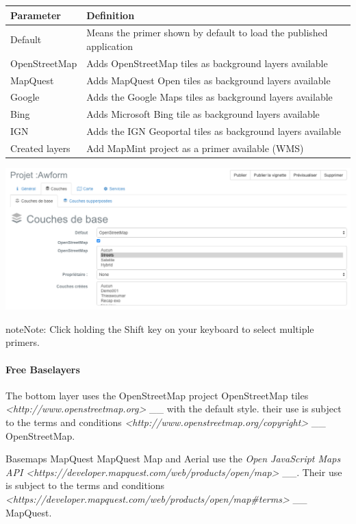 \documentclass[letterpaper,10pt,english]{sphinxmanual}
\begin{document}
\begin{tabulary}{\linewidth}{|L|L|}
\hline

\textbf{Parameter}
 & 
\textbf{Definition}
\\
\hline
Default
 & 
Means the primer shown by default to load the published application
\\
\hline
OpenStreetMap
 & 
Adds OpenStreetMap tiles as background layers available
\\
\hline
MapQuest
 & 
Adds MapQuest Open tiles as background layers available
\\
\hline
Google
 & 
Adds the Google Maps tiles as background layers available
\\
\hline
Bing
 & 
Adds Microsoft Bing tile as background layers available
\\
\hline
IGN
 & 
Adds the IGN Geoportal tiles as background layers available
\\
\hline
Created layers
 & 
Add MapMint project as a primer available (WMS)
\\
\hline\end{tabulary}


\includegraphics[width=1.000\linewidth]{publisher-baselayers-conf.png}

\begin{notice}{note}{Note:}
Click holding the Shift key on your keyboard to select multiple primers.
\end{notice}
\paragraph{Free Baselayers}

The bottom layer uses the OpenStreetMap project OpenStreetMap tiles \emph{\textless{}http://www.openstreetmap.org\textgreater{}} \_\_ with the default style. their use is subject to the terms and conditions \emph{\textless{}http://www.openstreetmap.org/copyright\textgreater{}} \_\_ OpenStreetMap.

Basemaps MapQuest MapQuest Map and Aerial use the \emph{Open JavaScript Maps API \textless{}https://developer.mapquest.com/web/products/open/map\textgreater{}} \_\_. Their use is subject to the terms and conditions \emph{\textless{}https://developer.mapquest.com/web/products/open/map\#terms\textgreater{}} \_\_ MapQuest.
\end{document}
